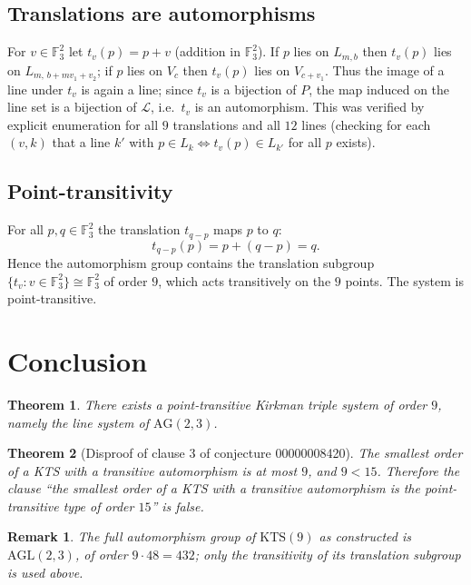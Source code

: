 \documentclass[11pt]{article}
\newtheorem{theorem}{Theorem}
\newtheorem{remark}{Remark}
\begin{document}
\subsection{Translations are automorphisms}

For $v \in \mathbb{F}_3^2$ let $t_v(p) = p + v$ (addition in
$\mathbb{F}_3^2$).  If $p$ lies on $L_{m,b}$ then $t_v(p)$ lies on
$L_{m,\, b + m v_1 + v_2}$; if $p$ lies on $V_c$ then $t_v(p)$ lies on
$V_{c + v_1}$.  Thus the image of a line under $t_v$ is again a line; since
$t_v$ is a bijection of $P$, the map induced on the line set is a bijection
of $\mathcal{L}$, i.e.\ $t_v$ is an automorphism.  This was verified by
explicit enumeration for all $9$ translations and all $12$ lines (checking
for each $(v,k)$ that a line $k'$ with
$p \in L_k \Leftrightarrow t_v(p) \in L_{k'}$ for all $p$ exists).

\subsection{Point-transitivity}

For all $p, q \in \mathbb{F}_3^2$ the translation $t_{q-p}$ maps $p$ to $q$:
\[
t_{q-p}(p) = p + (q - p) = q.
\]
Hence the automorphism group contains the translation subgroup
$\{t_v : v \in \mathbb{F}_3^2\} \cong \mathbb{F}_3^2$ of order $9$, which acts
transitively on the $9$ points.  The system is point-transitive.

\section{Conclusion}

\begin{theorem}
There exists a point-transitive Kirkman triple system of order $9$, namely
the line system of $\mathrm{AG}(2,3)$.
\end{theorem}

\begin{theorem}[Disproof of clause 3 of conjecture 00000008420]
The smallest order of a KTS with a transitive automorphism is at most $9$,
and $9 < 15$.  Therefore the clause ``the smallest order of a KTS with a
transitive automorphism is the point-transitive type of order $15$'' is
false.
\end{theorem}

\begin{remark}
The full automorphism group of $\mathrm{KTS}(9)$ as constructed is
$\mathrm{AGL}(2,3)$, of order $9 \cdot 48 = 432$; only the transitivity of
its translation subgroup is used above.
\end{remark}
\end{document}
